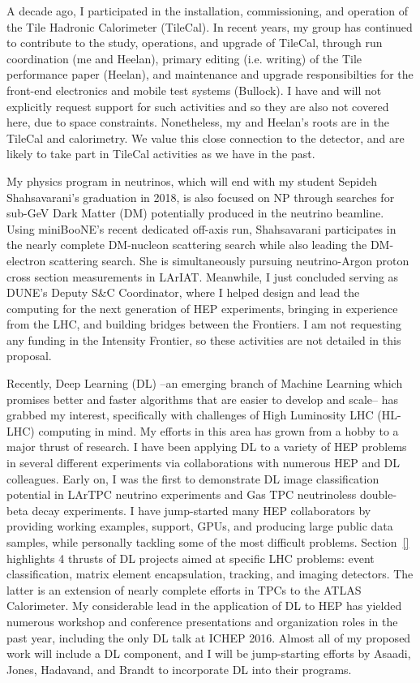 A decade ago, I participated in the installation, commissioning, and
operation of the Tile Hadronic Calorimeter (TileCal). In recent years,
my group has continued to contribute to the study, operations, and
upgrade of TileCal, through run coordination (me and Heelan), primary
editing (i.e. writing) of the Tile performance paper (Heelan), and
maintenance and upgrade responsibilties for the front-end electronics
and mobile test systems (Bullock). I have and will not explicitly
request support for such activities and so they are also not covered
here, due to space constraints. Nonetheless, my and Heelan's roots are
in the TileCal and calorimetry. We value this close connection to the
detector, and are likely to take part in TileCal activities as we have
in the past.

My physics program in neutrinos, which will end with my student
Sepideh Shahsavarani's graduation in 2018, is also focused on NP
through searches for sub-GeV Dark Matter (DM) potentially produced in
the neutrino beamline. Using miniBooNE's recent dedicated off-axis
run, Shahsavarani participates in the nearly complete DM-nucleon
scattering search while also leading the DM-electron scattering
search. She is simultaneously pursuing neutrino-Argon proton cross
section measurements in LArIAT. Meanwhile, I just concluded serving as
DUNE's Deputy S\&C Coordinator, where I helped design and lead the
computing for the next generation of HEP experiments, bringing in
experience from the LHC, and building bridges between the Frontiers. I
am not requesting any funding in the Intensity Frontier, so these
activities are not detailed in this proposal. 

Recently, Deep Learning (DL) --an emerging branch of Machine Learning
which promises better and faster algorithms that are easier to develop
and scale-- has grabbed my interest, specifically with challenges of
High Luminosity LHC (HL-LHC) computing in mind. My efforts in this
area has grown from a hobby to a major thrust of research. I have been
applying DL to a variety of HEP problems in several different
experiments via collaborations with numerous HEP and DL
colleagues. Early on, I was the first to demonstrate DL image
classification potential in LArTPC neutrino experiments and Gas TPC
neutrinoless double-beta decay experiments. I have jump-started many
HEP collaborators by providing working examples, support, GPUs, and
producing large public data samples, while personally tackling some of
the most difficult problems. Section~\ref{} highlights 4 thrusts of DL
projects aimed at specific LHC problems: event classification, matrix
element encapsulation, tracking, and imaging detectors. The latter is
an extension of nearly complete efforts in TPCs to the ATLAS
Calorimeter.  My considerable lead in the application of DL to HEP has
yielded numerous workshop and conference presentations and
organization roles in the past year\cite{}, including the only DL talk
at ICHEP 2016\cite{}.  Almost all of my proposed work will include a
DL component, and I will be jump-starting efforts by Asaadi, Jones,
Hadavand, and Brandt to incorporate DL into their programs.

